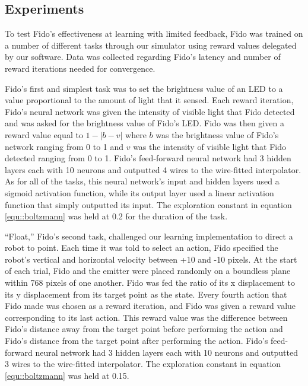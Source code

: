 \subsection{Experiments}

To test Fido's effectiveness at learning with limited feedback, Fido was trained on a number of different tasks through our simulator using reward values delegated by our software. Data was collected regarding Fido's latency and number of reward iterations needed for convergence.

Fido's first and simplest task was to set the brightness value of an LED to a value proportional to the amount of light that it sensed. Each reward iteration, Fido's neural network was given the intensity of visible light that Fido detected and was asked for the brightness value of Fido's LED. Fido was then given a reward value equal to $1 - |b - v|$ where $b$ was the brightness value of Fido's network ranging from 0 to 1 and $v$ was the intensity of visible light that Fido detected ranging from 0 to 1. Fido's feed-forward neural network had 3 hidden layers each with 10 neurons and outputted 4 wires to the wire-fitted interpolator. As for all of the tasks, this neural network's input and hidden layers used a sigmoid activation function, while  its output layer used a linear activation function that simply outputted its input. The exploration constant in equation \ref{equ::boltzmann} was held at 0.2 for the duration of the task.

``Float,'' Fido's second task, challenged our learning implementation to direct a robot to point. Each time it was told to select an action, Fido specified the robot's vertical and horizontal velocity between +10 and -10 pixels. At the start of each trial, Fido and the emitter were placed randomly on a boundless plane within 768 pixels of one another. Fido was fed the ratio of its x displacement to its y displacement from its target point as the state. Every fourth action that Fido made was chosen as a reward iteration, and Fido was given a reward value corresponding to its last action. This reward value was the difference between Fido's distance away from the target point before performing the action and Fido's distance from the target point after performing the action. Fido's feed-forward neural network had 3 hidden layers each with 10 neurons and outputted 3 wires to the wire-fitted interpolator. The exploration constant in equation \ref{equ::boltzmann} was held at 0.15.

